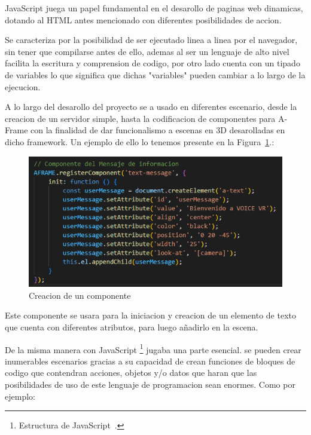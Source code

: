 \documentclass[a4paper, 12pt]{book}
\begin{document}
JavaScript juega un papel fundamental en el desarollo de paginas web dinamicas, dotando al HTML antes mencionado con diferentes posibilidades de accion.

Se caracteriza por la posibilidad de ser ejecutado linea a linea por el navegador, sin tener que compilarse antes de ello, ademas al ser un lenguaje de alto nivel facilita la escritura y comprension de codigo, por otro lado cuenta con un tipado de variables lo que significa que dichas "variables" pueden cambiar a lo largo de la ejecucion.

A lo largo del desarollo del proyecto se a usado en diferentes escenario, desde la creacion de un servidor simple, hasta la codificacion de componentes para A-Frame con la finalidad de dar funcionalismo a escenas en 3D desarolladas en dicho framework. Un ejemplo de ello lo tenemos presente en la Figura~\ref{fig:component-aFrame}.: 

\begin{figure}[H]
    \centering
    \includegraphics[width=0.8\linewidth]{img/text_msg.png}
    \caption{Creacion de un componente}
    \label{fig:component-aFrame}
\end{figure}
Este componente se usara para la iniciacion y creacion de un elemento de texto que cuenta con diferentes atributos, para luego añadirlo en la escena.

De la misma manera con JavaScript \footnote{Estructura de JavaScript~\cite{mdn_javascript_data_structures}.} jugaba una parte esencial. se pueden crear inumerables escenarios gracias a su capacidad de crean funciones de bloques de codigo que contendran acciones, objetos y/o datos que haran que las posibilidades de uso de este lenguaje de programacion sean enormes. Como por ejemplo: 
\end{document}
